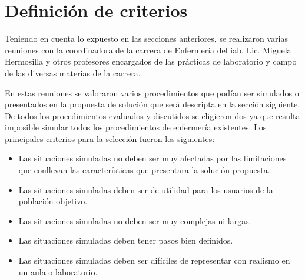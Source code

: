 \section{Definición de criterios}
\label{sec:definicion_criterios}

Teniendo en cuenta lo expuesto en las secciones anteriores, se realizaron varias reuniones con la coordinadora de la carrera de Enfermería del \Gls{iab}, Lic. Miguela Hermosilla y otros profesores encargados de las
prácticas de laboratorio y campo de las diversas materias de la carrera.

En estas reuniones se valoraron varios procedimientos que podían ser simulados o presentados en la
propuesta de solución que será descripta en la sección siguiente. De todos los procedimientos evaluados
y discutidos se eligieron dos ya que resulta imposible simular todos los procedimientos de enfermería
existentes. Los principales criterios para la selección fueron los siguientes:

\begin{itemize}
\item Las situaciones simuladas no deben ser muy afectadas por las limitaciones que conllevan las 
características que presentara la solución propuesta.
\item Las situaciones simuladas deben ser de utilidad para los usuarios de la población objetivo.
\item Las situaciones simuladas no deben ser muy complejas ni largas.
\item Las situaciones simuladas deben tener pasos bien definidos.
\item Las situaciones simuladas deben ser difíciles de representar con realismo en un aula o laboratorio.
\end{itemize}


